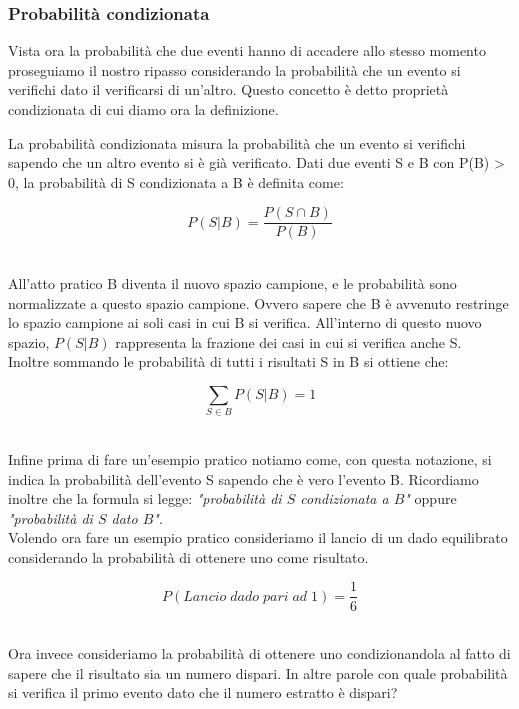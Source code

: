 \documentclass[../main.tex]{subfiles}
\begin{document}
\subsubsection{Probabilità condizionata}

Vista ora la probabilità che due eventi hanno di accadere allo stesso momento proseguiamo il nostro ripasso considerando la probabilità che un evento si verifichi dato il verificarsi di un'altro. Questo concetto è detto proprietà condizionata di cui diamo ora la definizione.

\begin{definition*}

La probabilità condizionata misura la probabilità che un evento si verifichi sapendo che un altro evento si è già verificato. Dati due eventi S e B con P(B) > 0, la probabilità di S condizionata a B è definita come:

\[P(S|B) = \frac{P(S \cap B)}{P(B)}\]\
	
\end{definition*}

All'atto pratico B diventa il nuovo spazio campione, e le probabilità sono normalizzate a questo spazio campione. Ovvero sapere che B è avvenuto restringe lo spazio campione ai soli casi in cui B si verifica. All’interno di questo nuovo spazio, $P(S|B)$ rappresenta la frazione dei casi in cui si verifica anche S.\\

Inoltre sommando le probabilità di tutti i risultati S in B si ottiene che:

\[\sum_{S \in B} P(S|B) = 1\]\

Infine prima di fare un'esempio pratico notiamo come, con questa notazione, si indica la probabilità dell'evento S sapendo che è vero l'evento B.
Ricordiamo inoltre che la formula si legge: \textit{"probabilità di $S$ condizionata a $B$"} oppure \textit{"probabilità di $S$ dato $B$"}.\\

Volendo ora fare un esempio pratico consideriamo il lancio di un dado equilibrato considerando la probabilità di ottenere uno come risultato.

\[P(\unit{Lancio\;dado\;pari\;ad\;}  1) = \frac{1}{6}\]\

Ora invece consideriamo la probabilità di ottenere uno condizionandola al fatto di sapere che il risultato sia un numero dispari. In altre parole con quale probabilità si verifica il primo evento dato che il numero estratto è dispari?
\end{document}
